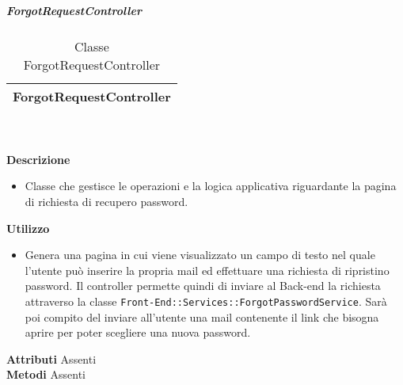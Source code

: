 			\subparagraph{ForgotRequestController} 
\begin{table}[ht]
\begin{center}
\bgroup
	\setlength{\arrayrulewidth}{0.6mm}
	\def\arraystretch{1}
		\begin{tabular}{ | p{12cm} | }
				\hline  
					\centerline{\textbf{ForgotRequestController}}
		\\ \hline 
				\hline
				\hline
		
		\end{tabular}
\egroup
\caption{Classe ForgotRequestController}
\end{center}
\end{table} \textbf{\\ \\ Descrizione}
\begin{itemize}
\item[] Classe che gestisce le operazioni e la logica applicativa riguardante la pagina di richiesta di recupero password.
\end{itemize} 
\textbf{Utilizzo}
\begin{itemize}
\item[] Genera una pagina in cui viene visualizzato un campo di testo nel quale l'utente può inserire la propria mail ed effettuare una richiesta di ripristino password. Il controller permette quindi di inviare al Back-end la richiesta attraverso la classe \texttt{Front-End::Services::ForgotPasswordService}. Sarà poi compito del  inviare all'utente una mail contenente il link che bisogna aprire per poter scegliere una nuova password.
\end{itemize}
\textbf{Attributi}
Assenti \\
\textbf{Metodi}
Assenti \\

